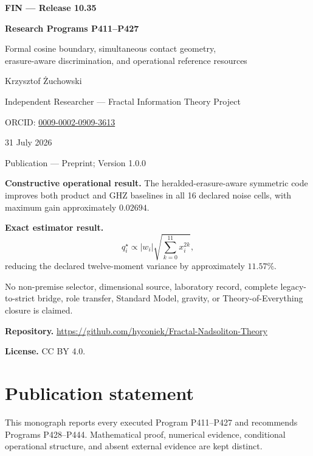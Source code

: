 \documentclass[11pt,a4paper,openany]{report}
\begin{document}
\hypersetup{pageanchor=false}
\begin{titlepage}
\centering
\vspace*{7mm}
{\Large\bfseries FIN --- Release 10.35\par}
\vspace{9mm}
{\Huge\bfseries Research Programs P411--P427\par}
\vspace{6mm}
{\Large Formal cosine boundary, simultaneous contact geometry,\\
erasure-aware discrimination, and operational reference resources\par}
\vspace{13mm}
{\Large Krzysztof \.Zuchowski\par}
\vspace{2mm}
{\normalsize Independent Researcher --- Fractal Information Theory Project\par}
\vspace{2mm}
{\normalsize ORCID:
\href{https://orcid.org/0009-0002-0909-3613}{0009-0002-0909-3613}\par}
\vspace{7mm}
{\large 31 July 2026\par}
{\normalsize Publication --- Preprint; Version 1.0.0\par}
\vfill
\begin{minipage}{0.92\textwidth}
\small
\textbf{Constructive operational result.}
The heralded-erasure-aware symmetric code improves both product and GHZ
baselines in all 16 declared noise cells, with maximum gain approximately
\(0.02694\).

\medskip
\textbf{Exact estimator result.}
\[
q_i^\star\propto |w_i|
\sqrt{\sum_{k=0}^{11}x_i^{2k}},
\]
reducing the declared twelve-moment variance by approximately \(11.57\%\).

\medskip
No non-premise selector, dimensional source, laboratory record, complete
legacy-to-strict bridge, role transfer, Standard Model, gravity, or
Theory-of-Everything closure is claimed.

\medskip
\textbf{Repository.}
\url{https://github.com/hyconiek/Fractal-Nadsoliton-Theory}

\textbf{License.} CC BY 4.0.
\end{minipage}
\vfill
\end{titlepage}
\hypersetup{pageanchor=true}
\chapter*{Publication statement}
This monograph reports every executed Program P411--P427 and recommends
Programs P428--P444. Mathematical proof, numerical evidence, conditional
operational structure, and absent external evidence are kept distinct.
\end{document}
